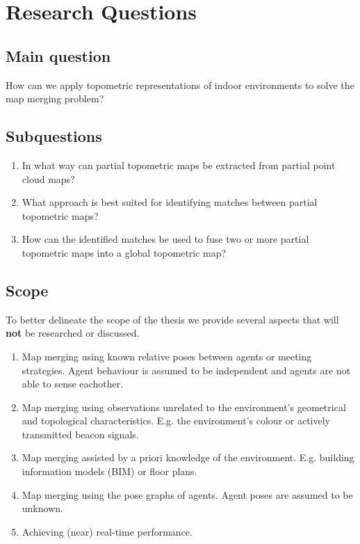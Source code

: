 \section{Research Questions}

\subsection{Main question}
How can we apply topometric representations of indoor environments to solve the map merging problem?

\subsection{Subquestions}
\begin{enumerate}
    \item In what way can partial topometric maps be extracted from partial point cloud maps?
    \item What approach is best suited for identifying matches between partial topometric maps?
    \item How can the identified matches be used to fuse two or more partial topometric maps into a global topometric map?
\end{enumerate}

\subsection{Scope}
To better delineate the scope of the thesis we provide several aspects that will \textbf{not} be researched or discussed. 

\begin{enumerate}
    \item Map merging using known relative poses between agents or meeting strategies. Agent behaviour is assumed to be independent and agents are not able to sense eachother.
    \item Map merging using observations unrelated to the environment's geometrical and topological characteristics. E.g. the environment's colour or actively transmitted beacon signals.
    \item Map merging assisted by a priori knowledge of the environment. E.g. building information models (BIM) or floor plans.
    \item Map merging using the pose graphs of agents. Agent poses are assumed to be unknown.
    \item Achieving (near) real-time performance.
\end{enumerate}